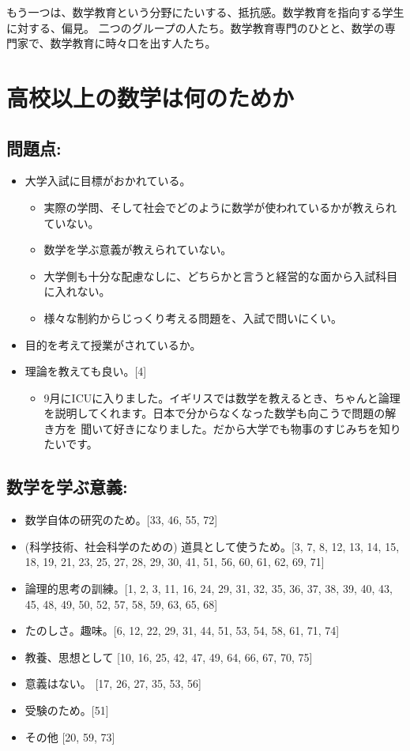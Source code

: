 \documentclass[12pt]{jarticle}
\begin{document}
もう一つは、数学教育という分野にたいする、抵抗感。数学教育を指向する学生に対する、偏見。
二つのグループの人たち。数学教育専門のひとと、数学の専門家で、数学教育に時々口を出す人たち。

\section{高校以上の数学は何のためか}

\subsection{問題点:}
\begin{itemize}
\item 大学入試に目標がおかれている。
	\begin{itemize}
	\item 実際の学問、そして社会でどのように数学が使われているかが教えられていない。
	\item 数学を学ぶ意義が教えられていない。
	\item 大学側も十分な配慮なしに、どちらかと言うと経営的な面から入試科目に入れない。
	\item 様々な制約からじっくり考える問題を、入試で問いにくい。
	\end{itemize}

\item 目的を考えて授業がされているか。

\item 理論を教えても良い。[4]
	\begin{itemize}
	\item 9月にICUに入りました。イギリスでは数学を教えるとき、ちゃんと論理
を説明してくれます。日本で分からなくなった数学も向こうで問題の解き方を
聞いて好きになりました。だから大学でも物事のすじみちを知りたいです。
	\end{itemize}

\end{itemize}

\subsection{数学を学ぶ意義:}
\begin{itemize}
\item 数学自体の研究のため。[33, 46, 55, 72]
\item (科学技術、社会科学のための) 道具として使うため。[3, 7, 8, 12, 13, 14, 15, 18, 19, 21, 23, 25, 27, 28, 29, 30, 41, 51, 56, 60, 61, 62, 69, 71]
\item 論理的思考の訓練。[1, 2, 3, 11, 16, 24, 29, 31, 32, 35, 36, 37, 38, 39, 40, 43, 45, 48, 49, 50, 52, 57, 58, 59, 63, 65, 68] 
\item たのしさ。趣味。[6, 12, 22, 29, 31, 44, 51, 53, 54, 58, 61, 71, 74]
\item 教養、思想として [10, 16, 25, 42, 47, 49, 64, 66, 67, 70, 75]
\item 意義はない。 [17, 26, 27, 35, 53, 56]
\item 受験のため。[51]
\item その他 [20, 59, 73]
\end{itemize}
\end{document}
